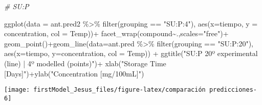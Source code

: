\documentclass[
]{article}
\newenvironment{Shaded}{\begin{snugshade}}{\end{snugshade}}
\newcommand{\AttributeTok}[1]{\textcolor[rgb]{0.77,0.63,0.00}{#1}}
\newcommand{\CommentTok}[1]{\textcolor[rgb]{0.56,0.35,0.01}{\textit{#1}}}
\newcommand{\FunctionTok}[1]{\textcolor[rgb]{0.00,0.00,0.00}{#1}}
\newcommand{\NormalTok}[1]{#1}
\newcommand{\SpecialCharTok}[1]{\textcolor[rgb]{0.00,0.00,0.00}{#1}}
\newcommand{\StringTok}[1]{\textcolor[rgb]{0.31,0.60,0.02}{#1}}
\begin{document}
\begin{Shaded}
\begin{Highlighting}[]
\CommentTok{\# SU:P}

\FunctionTok{ggplot}\NormalTok{(}\AttributeTok{data =}\NormalTok{ ant.pred2 }\SpecialCharTok{\%\textgreater{}\%} \FunctionTok{filter}\NormalTok{(grouping }\SpecialCharTok{==} \StringTok{"SU:P:4"}\NormalTok{), }\FunctionTok{aes}\NormalTok{(}\AttributeTok{x=}\NormalTok{tiempo, }\AttributeTok{y =}\NormalTok{ concentration, }\AttributeTok{col =}\NormalTok{ Temp))}\SpecialCharTok{+}
  \FunctionTok{facet\_wrap}\NormalTok{(compound}\SpecialCharTok{\textasciitilde{}}\NormalTok{.,}\AttributeTok{scales=}\StringTok{"free"}\NormalTok{)}\SpecialCharTok{+}
  \FunctionTok{geom\_point}\NormalTok{()}\SpecialCharTok{+}\FunctionTok{geom\_line}\NormalTok{(}\AttributeTok{data=}\NormalTok{ant.pred }\SpecialCharTok{\%\textgreater{}\%} \FunctionTok{filter}\NormalTok{(grouping }\SpecialCharTok{==} \StringTok{"SU:P:20"}\NormalTok{), }\FunctionTok{aes}\NormalTok{(}\AttributeTok{x=}\NormalTok{tiempo, }\AttributeTok{y=}\NormalTok{concentration, }\AttributeTok{col =}\NormalTok{ Temp)) }\SpecialCharTok{+}
  \FunctionTok{ggtitle}\NormalTok{(}\StringTok{"SU:P 20º experimental (line) | 4º modelled (points)"}\NormalTok{)}\SpecialCharTok{+} \FunctionTok{xlab}\NormalTok{(}\StringTok{"Storage Time [Days]"}\NormalTok{)}\SpecialCharTok{+}\FunctionTok{ylab}\NormalTok{(}\StringTok{"Concentration [mg/100mL]"}\NormalTok{)}
\end{Highlighting}
\end{Shaded}

\begin{center}\texttt{[image: firstModel\_Jesus\_files/figure-latex/comparación predicciones-6]} \end{center}
\end{document}
